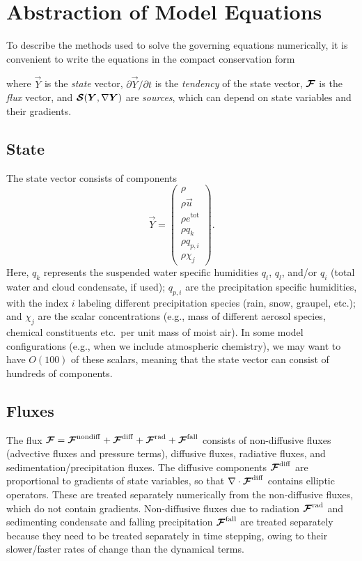 \documentclass{report}
\begin{document}
\chapter{Abstraction of Model Equations}\label{c:abstract_model_formulation}

To describe the methods used to solve the governing equations numerically, it is convenient to write the equations in the compact conservation form 

where $\vec{Y}$ is the \emph{state} vector, $\partial\vec{Y}/\partial t$ is the \emph{tendency} of the state vector, $\boldsymbol{{\mathcal{F}}}$ is the \emph{flux} vector, and $\boldsymbol{{\mathcal{S}}}(\boldsymbol{{Y}}, \nabla\boldsymbol{{Y}})$ are \emph{sources}, which can depend on state variables and their gradients. 

\section{State}

The state vector consists of components
\begin{equation}\label{e:state}
\vec{Y}=\left( \begin{array}{c}
\rho \\
\rho\vec{u} \\
\rho e^{\mathrm{tot}}\\
\rho q_k\\
\rho q_{p,i}\\
\rho \chi_j
\end{array}
\right).
\end{equation}
Here, $q_k$ represents the suspended water specific humidities $q_t$, $q_l$, and/or $q_i$ (total water and cloud condensate, if used); $q_{p,i}$ are the precipitation specific humidities, with the index $i$ labeling different precipitation species (rain, snow, graupel, etc.); and $\chi_j$ are the scalar concentrations (e.g., mass of different aerosol species, chemical constituents etc.\ per unit mass of moist air). In some model configurations (e.g., when we include atmospheric chemistry), we may want to have $O(100)$ of these scalars, meaning that the state vector can consist of hundreds of components.

\section{Fluxes}\label{sec:fluxes}

The flux $\boldsymbol{{\mathcal{F}}}=\boldsymbol{{\mathcal{F}}}^{\mathrm{nondiff}} + \boldsymbol{{\mathcal{F}}}^{\mathrm{diff}} + \boldsymbol{{\mathcal{F}}}^{\mathrm{rad}} + \boldsymbol{{\mathcal{F}}}^{\mathrm{fall}}$ consists of non-diffusive fluxes (advective fluxes and pressure terms), diffusive fluxes, radiative fluxes, and sedimentation/precipitation fluxes. The diffusive components $\boldsymbol{{\mathcal{F}}}^{\mathrm{diff}}$ are proportional to gradients of state variables, so that $\nabla \cdot \boldsymbol{{\mathcal{F}}}^{\mathrm{diff}}$ contains elliptic operators. These are treated separately numerically from the non-diffusive fluxes, which do not contain gradients. Non-diffusive fluxes due to radiation $\boldsymbol{{\mathcal{F}}}^{\mathrm{rad}}$ and sedimenting condensate and falling precipitation $\boldsymbol{{\mathcal{F}}}^{\mathrm{fall}}$ are treated separately because they need to be treated separately in time stepping, owing to their slower/faster rates of change than the dynamical terms. 
\end{document}
